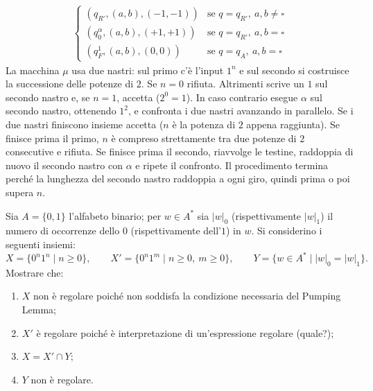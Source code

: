 \begin{sol}
\[\begin{matrix}
\begin{cases}
(q_{R'},(a,b),(-1,-1)) & \text{se } q=q_{R'},\ a,b\neq\square\\
(q_0^\alpha,(a,b),(+1,+1)) & \text{se } q=q_{R'},\ a,b=\square\\
(q_F^1,(a,b),(0,0)) & \text{se } q=q_A,\ a,b=\square
\end{cases}
\end{matrix}
\]
La macchina $\mu$ usa due nastri: sul primo c'è l'input $1^n$ e sul secondo si costruisce la successione delle potenze di $2$. Se $n=0$ rifiuta. Altrimenti scrive un $1$ sul secondo nastro e, se $n=1$, accetta ($2^0=1$). In caso contrario esegue $\alpha$ sul secondo nastro, ottenendo $1^2$, e confronta i due nastri avanzando in parallelo. Se i due nastri finiscono insieme accetta ($n$ è la potenza di $2$ appena raggiunta). Se finisce prima il primo, $n$ è compreso strettamente tra due potenze di $2$ consecutive e rifiuta. Se finisce prima il secondo, riavvolge le testine, raddoppia di nuovo il secondo nastro con $\alpha$ e ripete il confronto. Il procedimento termina perché la lunghezza del secondo nastro raddoppia a ogni giro, quindi prima o poi supera $n$.
\end{sol}

\newpage
\begin{ex}
Sia $A=\{0,1\}$ l'alfabeto binario; per $w\in A^*$ sia $|w|_0$ (rispettivamente $|w|_1$) il numero di occorrenze dello $0$ (rispettivamente dell'$1$) in $w$. Si considerino i seguenti insiemi:
\[
X=\{0^n1^n \mid n\geq 0\},\qquad X'=\{0^n1^m \mid n\geq 0,\ m\geq 0\},\qquad Y=\{w\in A^* \mid |w|_0=|w|_1\}.
\]
Mostrare che:
\begin{enumerate}
\item $X$ non è regolare poiché non soddisfa la condizione necessaria del Pumping Lemma;
\item $X'$ è regolare poiché è interpretazione di un'espressione regolare (quale?);
\item $X=X'\cap Y$;
\item $Y$ non è regolare.
\end{enumerate}
\end{ex}

